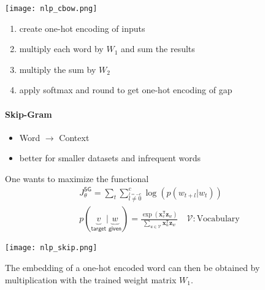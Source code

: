 \newpar{}
\begin{center}
    \texttt{[image: nlp\_cbow.png]}
\end{center}
\begin{enumerate}
    \item create one-hot encoding of inputs
    \item multiply each word by $W_1$ and sum the results
    \item multiply the sum by $W_2$
    \item apply softmax and round to get one-hot encoding of gap
\end{enumerate}

\paragraph{Skip-Gram}
\begin{itemize}
    \item Word $\to$ Context
    \item better for smaller datasets and infrequent words
\end{itemize}

One wants to maximize the functional
\noindent\begin{gather*}
    J_{\theta}^{\mathsf{SG}} = \sum_{t}\sum_{\overset{l=-c}{l\neq 0}}^{c} \log(p(w_{t+l}|w_t))\\
    p(\underbrace{v}_{\textsf{target}} | \underbrace{w}_{\textsf{given}})  = \frac{\exp(\mathbf{x}_v^{\mathsf{T}}\mathbf{z}_w)}{\sum\limits_{u\in \mathcal{V}} \mathbf{x}_u^{\mathsf{T}}\mathbf{z}_w} \quad \mathcal{V}: \text{Vocabulary}
\end{gather*}

\newpar{}
\begin{center}
    \texttt{[image: nlp\_skip.png]}
\end{center}
The embedding of a one-hot encoded word can then be obtained by multiplication with the trained weight matrix $W_1$.

